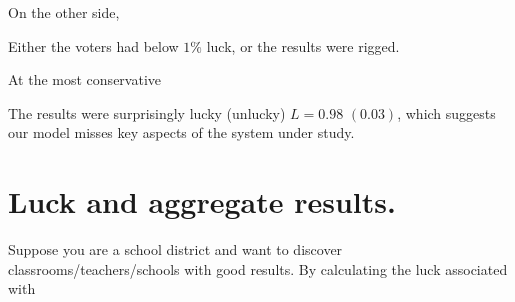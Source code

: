 On the other side,
\begin{blockquote}
Either the voters had below $1\%$ luck, or the results were rigged.
\end{blockquote}

At the most conservative
\begin{blockquote}
The results were surprisingly lucky (unlucky) $L=0.98$ $(0.03)$, which suggests our model misses key aspects of the system under study.
\end{blockquote}

\section{Luck and aggregate results.}
Suppose you are a school district and want to discover classrooms/teachers/schools with good results.  By calculating the luck associated with 
